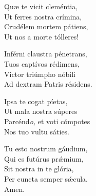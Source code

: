 Quæ te vicit cleméntia,\\
Ut ferres nostra crímina,\\
Crudélem mortem pátiens,\\
Ut nos a morte tólleres!

Inférni claustra pénetrans,\\
Tuos captívos rédimens,\\
Victor triúmpho nóbili\\
Ad dextram Patris résidens.

Ipsa te cogat píetas,\\
Ut mala nostra súperes\\
Parcénd\textit{o,} et voti cómpotes\\
Nos tuo vultu sáties.

Tu esto nostrum gáudium,\\
Qui es futúrus prǽmium,\\
Sit nostra in te glória,\\
Per cuncta semper sǽcula.\\
Amen.